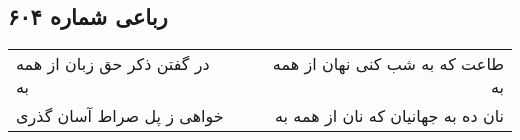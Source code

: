 \begin{center}
\section*{رباعی شماره ۶۰۴}
\label{sec:sh604}
\begin{longtable}{l p{0.5cm} r}
در گفتن ذکر حق زبان از همه به
&&
طاعت که به شب کنی نهان از همه به
\\
خواهی ز پل صراط آسان گذری
&&
نان ده به جهانیان که نان از همه به
\\
\end{longtable}
\end{center}
